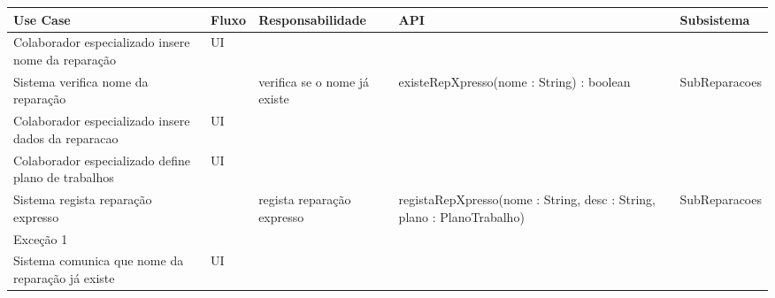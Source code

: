 \documentclass[../relatorio.tex]{subfiles}
\begin{document}
\begin{landscape}
    \begin{table}[!h]
        \centering
        \begin{tabular}{|p{5cm}|p{1cm}|p{4cm}|p{6cm}|p{3cm}|}
            \hline
            \rowcolor{gray!20!white}
            Use Case & Fluxo                                            & Responsabilidade & API & Subsistema \\
            \hline
            \rowcolor{yellow}
            Colaborador especializado insere nome da reparação
                     & UI
                     & 
                     & 
                     & 
            \\
            \hline
            Sistema verifica nome da reparação
                     & 
                     & verifica se o nome já existe
                     & existeRepXpresso(nome : String) : boolean
                     & SubReparacoes
            \\
            \hline
            \rowcolor{yellow}
            Colaborador especializado insere dados da reparacao
                     & UI
                     & 
                     & 
                     & 
            \\
            \hline
            Colaborador especializado define plano de trabalhos
                     & UI
                     & 
                     & 
                     & 
            \\
            \hline
            Sistema regista reparação expresso
                     & 
                     & regista reparação expresso
                     & registaRepXpresso(nome : String, desc : String, plano : PlanoTrabalho)
                     & SubReparacoes
            \\
            \hline
            \rowcolor{red!30}
            Exceção 1 &                                                  &                  &     &            \\
            \hline
            Sistema comunica que nome da reparação já existe
                     & UI
                     & 
                     & 
                     & 
            \\
            \hline
        \end{tabular}
    \end{table}
\end{landscape}
\end{document}
